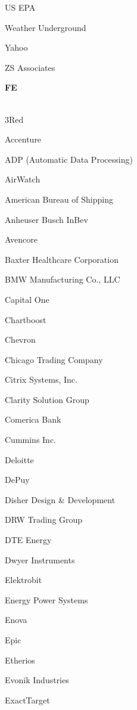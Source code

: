 \documentclass[twoside]{article}
\begin{document}
\begin{center}
\begin{multicols}{5}
\begin{FlushLeft}
\begin{compactitem}
\item US EPA
\item Weather Underground
\item Yahoo
\item ZS Associates
\end{compactitem}
        \end{FlushLeft}
        \vspace{1em}
        {\fontsize{14}{16}\selectfont \bf FE}\\
        \vspace{-1em}
        ~\hrulefill~
        \vspace{-.9em}
        \begin{FlushLeft}
        \begin{compactitem}
        \item 3Red
\item Accenture
\item ADP (Automatic Data Processing)
\item AirWatch
\item American Bureau of Shipping
\item Anheuser Busch InBev
\item Avencore
\item Baxter Healthcare Corporation
\item BMW Manufacturing Co., LLC
\item Capital One
\item Chartboost
\item Chevron
\item Chicago Trading Company
\item Citrix Systems, Inc.
\item Clarity Solution Group
\item Comerica Bank
\item Cummins Inc.
\item Deloitte
\item DePuy
\item Disher Design \& Development
\item DRW Trading Group
\item DTE Energy
\item Dwyer Instruments
\item Elektrobit
\item Energy Power Systems
\item Enova
\item Epic
\item Etherios
\item Evonik Industries
\item ExactTarget

\end{compactitem}
\end{FlushLeft}
\end{multicols}
\end{center}
\end{document}
